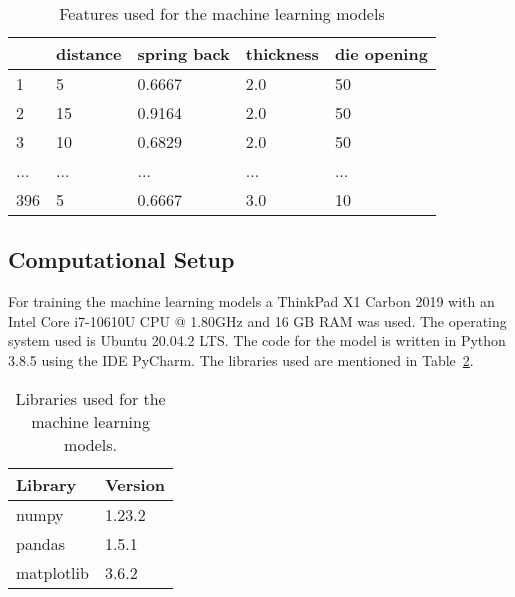 \begin{table}[H]
    \centering
    \begin{tabular}{|l|l|l|l|l|}
        \hline
        \textbf{} & \textbf{distance} & \textbf{spring back} & \textbf{thickness} & \textbf{die opening} \\ \hline
        1         & 5                 & 0.6667               & 2.0                & 50                   \\
        2         & 15                & 0.9164               & 2.0                & 50                   \\
        3         & 10                & 0.6829               & 2.0                & 50                   \\
        ...       & ...               & ...                  & ...                & ...                  \\
        396       & 5                 & 0.6667               & 3.0                & 10                   \\
        \hline
    \end{tabular}
    \caption{Features used for the machine learning models}
    \label{tab:dataset_example}
\end{table}



\subsection{Computational Setup}
For training the machine learning models a ThinkPad X1 Carbon 2019 with an Intel Core i7-10610U CPU @ 1.80GHz and 16 GB RAM was used. The operating system used is Ubuntu 20.04.2 LTS. The code for the model is written in Python 3.8.5 using the IDE PyCharm. The libraries used are mentioned in Table~\ref{table:libraries}.

\captionsetup{width=1\textwidth}

\begin{table}[H]
    \centering
    \begin{tabular}{|ll|}
        \hline
        \textbf{Library} & \textbf{Version} \\
        \hline
        numpy            & 1.23.2           \\
        pandas           & 1.5.1            \\
        matplotlib       & 3.6.2            \\ \hline
    \end{tabular}
    \caption{Libraries used for the machine learning models.}
    \label{table:libraries}
\end{table}


